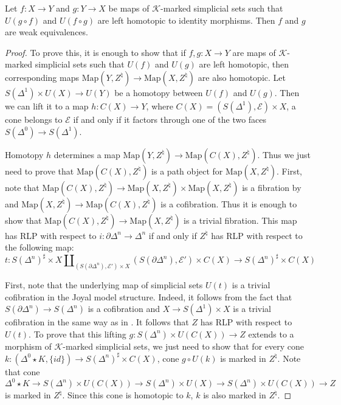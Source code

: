 \documentclass[reqno]{amsart}
\theoremstyle{definition}
\theoremstyle{remark}
\newcommand{\K}{$\mathcal{K}$}
\newcommand{\join}{\star}
\newcommand{\Map}{\mathrm{Map}}
\numberwithin{figure}{section}
\begin{document}
\begin{prop}[hom-we]
Let $f : X \to Y$ and $g : Y \to X$ be maps of \K-marked simplicial sets such that $U(g \circ f)$ and $U(f \circ g)$ are left homotopic to identity morphisms.
Then $f$ and $g$ are weak equivalences.
\end{prop}
\begin{proof}
To prove this, it is enough to show that if $f,g : X \to Y$ are maps of \K-marked simplicial sets such that $U(f)$ and $U(g)$ are left homotopic,
then corresponding maps $\Map(Y,Z^\natural) \to \Map(X,Z^\natural)$ are also homotopic.
Let $S(\Delta^1) \times U(X) \to U(Y)$ be a homotopy between $U(f)$ and $U(g)$.
Then we can lift it to a map $h : C(X) \to Y$, where $C(X) = (S(\Delta^1),\mathcal{E}) \times X$,
a cone belongs to $\mathcal{E}$ if and only if it factors through one of the two faces $S(\Delta^0) \to S(\Delta^1)$.

Homotopy $h$ determines a map $\Map(Y,Z^\natural) \to \Map(C(X),Z^\natural)$.
Thus we just need to prove that $\Map(C(X),Z^\natural)$ is a path object for $\Map(X,Z^\natural)$.
First, note that $\Map(C(X),Z^\natural) \to \Map(X,Z^\natural) \times \Map(X,Z^\natural)$
is a fibration by  and $\Map(X,Z^\natural) \to \Map(C(X),Z^\natural)$ is a cofibration.
Thus it is enough to show that $\Map(C(X),Z^\natural) \to \Map(X,Z^\natural)$ is a trivial fibration.
This map has RLP with respect to $i : \partial \Delta^n \to \Delta^n$ if and only if $Z^\natural$ has RLP with respect to the following map:
\[ t : S(\Delta^n)^\sharp \times X \amalg_{(S(\partial \Delta^n),\mathcal{E'}) \times X} (S(\partial \Delta^n),\mathcal{E'}) \times C(X) \to S(\Delta^n)^\sharp \times C(X) \]

First, note that the underlying map of simplicial sets $U(t)$ is a trivial cofibration in the Joyal model structure.
Indeed, it follows from the fact that $S(\partial \Delta^n) \to S(\Delta^n)$ is a cofibration
and $X \to S(\Delta^1) \times X$ is a trivial cofibration in the same way as in .
It follows that $Z$ has RLP with respect to $U(t)$.
To prove that this lifting $g : S(\Delta^n) \times U(C(X)) \to Z$ extends to a morphism of \K-marked simplicial sets,
we just need to show that for every cone $k : (\Delta^0 \join K, \{id\}) \to S(\Delta^n)^\sharp \times C(X)$, cone $g \circ U(k)$ is marked in $Z^\natural$.
Note that cone $\Delta^0 \join K \to S(\Delta^n) \times U(C(X)) \to S(\Delta^n) \times U(X) \to S(\Delta^n) \times U(C(X)) \to Z$ is marked in $Z^\natural$.
Since this cone is homotopic to $k$, $k$ is also marked in $Z^\natural$.
\end{proof}
\end{document}
